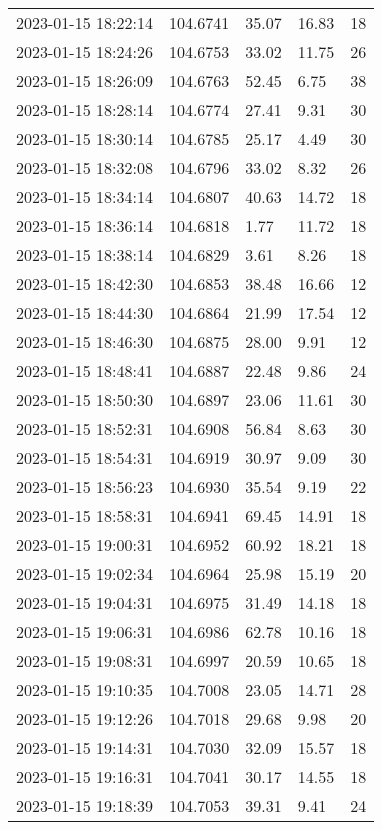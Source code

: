 \documentclass{nature_plusfigure}
\begin{document}
\begin{supplement}
\begin{center}
\begin{longtable}{lllll}
2023-01-15 18:22:14 & 104.6741 & 35.07 & 16.83 & 18 \\ 
2023-01-15 18:24:26 & 104.6753 & 33.02 & 11.75 & 26 \\ 
2023-01-15 18:26:09 & 104.6763 & 52.45 & 6.75 & 38 \\ 
2023-01-15 18:28:14 & 104.6774 & 27.41 & 9.31 & 30 \\ 
2023-01-15 18:30:14 & 104.6785 & 25.17 & 4.49 & 30 \\ 
2023-01-15 18:32:08 & 104.6796 & 33.02 & 8.32 & 26 \\ 
2023-01-15 18:34:14 & 104.6807 & 40.63 & 14.72 & 18 \\ 
2023-01-15 18:36:14 & 104.6818 & 1.77 & 11.72 & 18 \\ 
2023-01-15 18:38:14 & 104.6829 & 3.61 & 8.26 & 18 \\ 
2023-01-15 18:42:30 & 104.6853 & 38.48 & 16.66 & 12 \\ 
2023-01-15 18:44:30 & 104.6864 & 21.99 & 17.54 & 12 \\ 
2023-01-15 18:46:30 & 104.6875 & 28.00 & 9.91 & 12 \\ 
2023-01-15 18:48:41 & 104.6887 & 22.48 & 9.86 & 24 \\ 
2023-01-15 18:50:30 & 104.6897 & 23.06 & 11.61 & 30 \\ 
2023-01-15 18:52:31 & 104.6908 & 56.84 & 8.63 & 30 \\ 
2023-01-15 18:54:31 & 104.6919 & 30.97 & 9.09 & 30 \\ 
2023-01-15 18:56:23 & 104.6930 & 35.54 & 9.19 & 22 \\ 
2023-01-15 18:58:31 & 104.6941 & 69.45 & 14.91 & 18 \\ 
2023-01-15 19:00:31 & 104.6952 & 60.92 & 18.21 & 18 \\ 
2023-01-15 19:02:34 & 104.6964 & 25.98 & 15.19 & 20 \\ 
2023-01-15 19:04:31 & 104.6975 & 31.49 & 14.18 & 18 \\ 
2023-01-15 19:06:31 & 104.6986 & 62.78 & 10.16 & 18 \\ 
2023-01-15 19:08:31 & 104.6997 & 20.59 & 10.65 & 18 \\ 
2023-01-15 19:10:35 & 104.7008 & 23.05 & 14.71 & 28 \\ 
2023-01-15 19:12:26 & 104.7018 & 29.68 & 9.98 & 20 \\ 
2023-01-15 19:14:31 & 104.7030 & 32.09 & 15.57 & 18 \\ 
2023-01-15 19:16:31 & 104.7041 & 30.17 & 14.55 & 18 \\ 
2023-01-15 19:18:39 & 104.7053 & 39.31 & 9.41 & 24 \\ 

\end{longtable}
\end{center}
\end{supplement}
\end{document}
